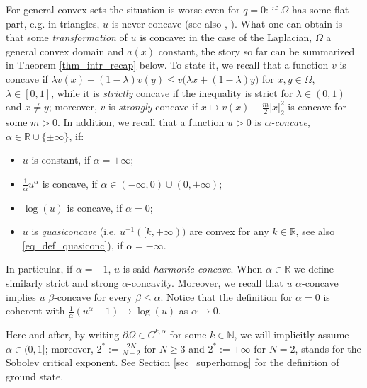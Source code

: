 \documentclass[11pt, reqno]{amsart}
\theoremstyle{definition}
\numberwithin{equation}{section}
\newcommand{\R}{\mathbb{R}}
\newcommand{\N}{\mathbb{N}}
\begin{document}
For general convex sets the situation is worse even for $q=0$: if $\Omega$ has some flat part, e.g. in triangles, $u$ is never concave \cite[Theorem 18 in Section 7]{Ken84} (see also \cite[Section 11]{KeMn93}, \cite{Ste22}). 
 What one can obtain is that some \emph{transformation} of $u$ is concave: 
in the case of the Laplacian, $\Omega$ a general convex domain and $a(x)$ constant, the story so far can be summarized in Theorem \ref{thm_intr_recap} below. 
To state it, we recall that a function $v$ is concave if $\lambda v(x) + (1-\lambda) v(y) \leq v\big( \lambda x + (1-\lambda) y\big)$
for $x,y \in \Omega$, $\lambda \in [0,1]$, while it is \emph{strictly} concave if the inequality is strict for $\lambda \in (0,1)$ and $x \neq y$; moreover, $v$ is \emph{strongly} concave if $x \mapsto v(x)- \frac{m}{2}|x|_2^2$ is concave for some $m>0$.
In addition, we recall that a function $u>0$ is \emph{$\alpha$-concave}, $\alpha \in \R \cup \{\pm \infty\}$, if:
\begin{itemize}
\item $u$ is constant, if $\alpha=+\infty$;
\item $\frac{1}{\alpha} u^{\alpha}$ is concave, if $\alpha\in (-\infty, 0) \cup (0,+\infty) $;
\item $\log(u)$ is concave, if $\alpha=0$;
\item $u$ is \emph{quasiconcave} (i.e. $u^{-1}([k,+\infty))$ are convex for any $k \in \R$, see also \eqref{eq_def_quasiconc}), if $\alpha=-\infty$.
\end{itemize}
In particular, if $\alpha=-1$, $u$ is said \emph{harmonic concave}. 
When $\alpha \in \R$ we define similarly strict and strong $\alpha$-concavity. 
Moreover, we recall that $u$ $\alpha$-concave implies $u$ $\beta$-concave for every $\beta \leq \alpha$. Notice that the definition for $\alpha=0$ is coherent with $\frac{1}{\alpha} (u^\alpha - 1) \to \log(u)$ as $\alpha \to 0$.

Here and after, by writing $\partial \Omega \in C^{k,\alpha}$ for some $k \in \N$, we will implicitly assume $\alpha \in (0,1]$; moreover, $2^*:=\frac{2N}{N-2}$ for $N\geq 3$ and $2^*:=+\infty$ for $N=2$, stands for the Sobolev critical exponent.
See Section \ref{sec_superhomog} for the definition of ground state.
\end{document}
